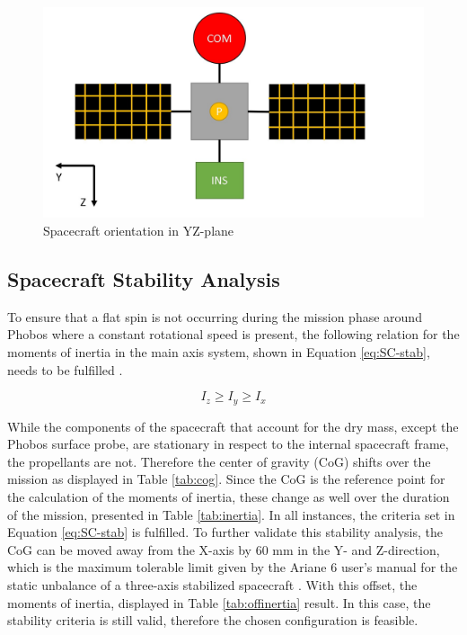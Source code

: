 \documentclass[conference]{IEEEtran}
\begin{document}
\begin{figure}[H]
  \centering
  \includegraphics[width=0.9\linewidth]{img/Phobos YZ.jpg}
  \caption{Spacecraft orientation in YZ-plane}
  \label{fig:SC-YZ}
\end{figure}

\subsection{Spacecraft Stability Analysis}
\label{subsection:sc-stab-anal}

To ensure that a flat spin is not occurring during the mission phase around Phobos where a constant rotational speed is present, the following relation for the moments of inertia in the main axis system, shown in Equation \ref{eq:SC-stab}, needs to be fulfilled \cite{Walter.2018}.

\begin{equation}
I_z \ge I_y \ge I_x
\label{eq:SC-stab}
\end{equation}

While the components of the spacecraft that account for the dry mass, except the Phobos surface probe, are stationary in respect to the internal spacecraft frame, the propellants are not. Therefore the center of gravity (CoG) shifts over the mission as displayed in Table \ref{tab:cog}. Since the CoG is the reference point for the calculation of the moments of inertia, these change as well over the duration of the mission, presented in Table \ref{tab:inertia}. In all instances, the criteria set in Equation \ref{eq:SC-stab} is fulfilled. To further validate this stability analysis, the CoG can be moved away from the X-axis by 60 mm in the Y- and Z-direction, which is the maximum tolerable limit given by the Ariane 6 user's manual for the static unbalance of a three-axis stabilized spacecraft \cite{Arianspace.2016}. With this offset, the moments of inertia, displayed in Table \ref{tab:offinertia} result. In this case, the stability criteria is still valid, therefore the chosen configuration is feasible.
\end{document}
